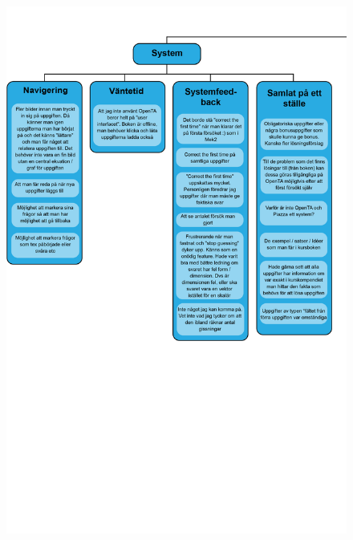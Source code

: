 \begin{figure}[hbtp]
    \centering
    \includegraphics[scale=0.454,angle=90]{appendix/appendix_blue/nr8_part1.png}
    \caption*{}
    \label{fig:nr8_part1}
\end{figure}


